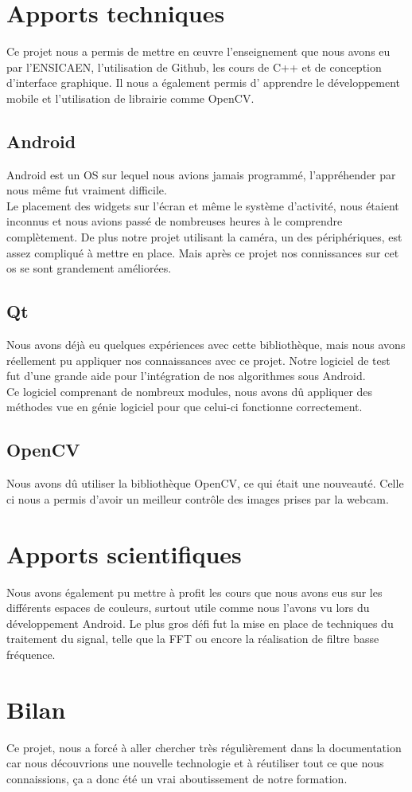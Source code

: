 \section{Apports techniques}

Ce projet nous a permis de mettre en œuvre l'enseignement que nous avons eu par l'ENSICAEN, l'utilisation de Github, les cours de C++ et de conception d'interface graphique. Il nous a également permis d'
apprendre le développement mobile et l'utilisation de librairie comme OpenCV\@.

\subsection{Android}
	Android est un OS sur lequel nous avions jamais programmé, l'appréhender par nous même fut vraiment difficile.\\
	Le placement des widgets sur l'écran et même le système d'activité, nous étaient inconnus et nous avions passé de nombreuses heures à le comprendre complètement.
	De plus notre projet utilisant la caméra, un des périphériques, est assez compliqué à mettre en place.
	Mais après ce projet nos connissances sur cet os se sont grandement améliorées.

\subsection{Qt}
	Nous avons déjà eu quelques expériences avec cette bibliothèque, mais nous avons réellement pu appliquer nos connaissances avec ce projet.
	Notre logiciel de test fut d'une grande aide pour l'intégration de nos algorithmes sous Android.\\
	Ce logiciel comprenant de nombreux modules, nous avons dû appliquer des méthodes vue en génie logiciel pour que celui-ci fonctionne correctement.

\subsection{OpenCV}
Nous avons dû utiliser la bibliothèque OpenCV, ce qui était une nouveauté. Celle ci nous a permis d'avoir un meilleur contrôle des images prises par la webcam.

\section{Apports scientifiques}

Nous avons également pu mettre à profit les cours que nous avons eus sur les différents espaces de couleurs, surtout utile comme nous l'avons vu lors du développement Android. Le plus gros défi fut la mise
en place de techniques du traitement du signal, telle que la FFT ou encore la réalisation de filtre basse fréquence. 

\section{Bilan}

Ce projet, nous a forcé à aller chercher très régulièrement dans la documentation car nous découvrions une nouvelle technologie et à réutiliser tout ce que nous connaissions, ça a donc été un vrai 
aboutissement de notre formation.
